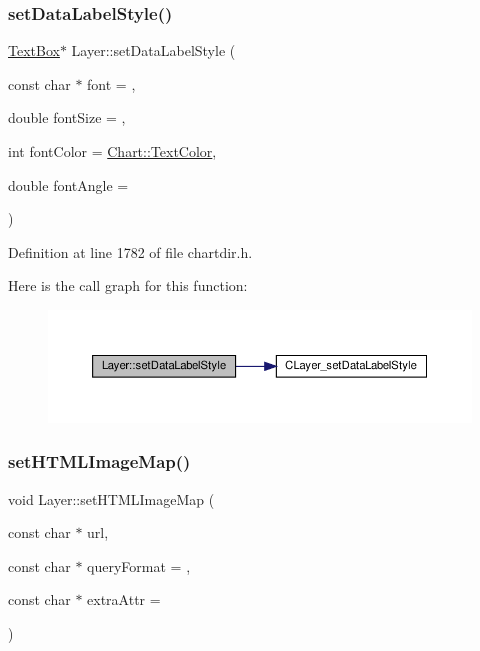\subsubsection{\texorpdfstring{set\+Data\+Label\+Style()}{setDataLabelStyle()}}
{\footnotesize\ttfamily \hyperlink{class_text_box}{Text\+Box}$\ast$ Layer\+::set\+Data\+Label\+Style (\begin{DoxyParamCaption}\item[{const char $\ast$}]{font = {},  }\item[{double}]{font\+Size = {},  }\item[{int}]{font\+Color = {\ttfamily \hyperlink{namespace_chart_abee0d882fdc9ad0b001245ad9fc64011a879e14f2f5024caccc047374342321ef}{Chart\+::\+Text\+Color}},  }\item[{double}]{font\+Angle = {} }\end{DoxyParamCaption})\hspace{0.3cm}{\ttfamily [inline]}}



Definition at line 1782 of file chartdir.\+h.

Here is the call graph for this function\+:
\nopagebreak
\begin{figure}[H]
\begin{center}
\leavevmode
\includegraphics[width=350pt]{class_layer_ab9822ec131202c3959fa3235fb48746a_cgraph}
\end{center}
\end{figure}
\mbox{\label{class_layer_a236aba467e0154dcfff6541731dc9ec5}} 
\subsubsection{\texorpdfstring{set\+H\+T\+M\+L\+Image\+Map()}{setHTMLImageMap()}}
{\footnotesize\ttfamily void Layer\+::set\+H\+T\+M\+L\+Image\+Map (\begin{DoxyParamCaption}\item[{const char $\ast$}]{url,  }\item[{const char $\ast$}]{query\+Format = {},  }\item[{const char $\ast$}]{extra\+Attr = {} }\end{DoxyParamCaption})\hspace{0.3cm}{\ttfamily [inline]}}



